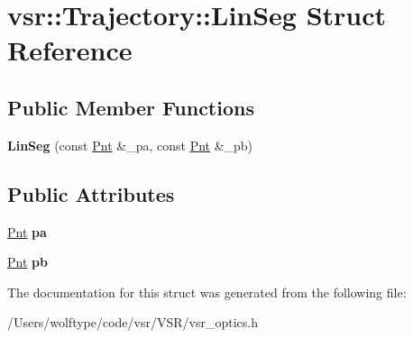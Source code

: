 \hypertarget{structvsr_1_1_trajectory_1_1_lin_seg}{\section{vsr\-:\-:Trajectory\-:\-:Lin\-Seg Struct Reference}
\label{structvsr_1_1_trajectory_1_1_lin_seg}
}
\subsection*{Public Member Functions}
\begin{DoxyCompactItemize}
\item 
\hypertarget{structvsr_1_1_trajectory_1_1_lin_seg_aea45814a98c6b858736d170f8493a71c}{{\bfseries Lin\-Seg} (const \hyperlink{namespacevsr_a2d05beb9721c5d9211b479af6d47222d}{Pnt} \&\-\_\-pa, const \hyperlink{namespacevsr_a2d05beb9721c5d9211b479af6d47222d}{Pnt} \&\-\_\-pb)}\label{structvsr_1_1_trajectory_1_1_lin_seg_aea45814a98c6b858736d170f8493a71c}

\end{DoxyCompactItemize}
\subsection*{Public Attributes}
\begin{DoxyCompactItemize}
\item 
\hypertarget{structvsr_1_1_trajectory_1_1_lin_seg_a7f149ee8587ee219551ce7e79f30487d}{\hyperlink{namespacevsr_a2d05beb9721c5d9211b479af6d47222d}{Pnt} {\bfseries pa}}\label{structvsr_1_1_trajectory_1_1_lin_seg_a7f149ee8587ee219551ce7e79f30487d}

\item 
\hypertarget{structvsr_1_1_trajectory_1_1_lin_seg_abbc1d8be830b1727fe61ade5d291a22f}{\hyperlink{namespacevsr_a2d05beb9721c5d9211b479af6d47222d}{Pnt} {\bfseries pb}}\label{structvsr_1_1_trajectory_1_1_lin_seg_abbc1d8be830b1727fe61ade5d291a22f}

\end{DoxyCompactItemize}


The documentation for this struct was generated from the following file\-:\begin{DoxyCompactItemize}
\item 
/\-Users/wolftype/code/vsr/\-V\-S\-R/vsr\-\_\-optics.\-h\end{DoxyCompactItemize}
